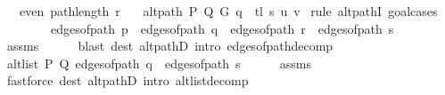 \begin{isabellebody}
\ \ \ {\isachardoublequoteopen}even\ {\isacharparenleft}{\kern0pt}path{\isacharunderscore}{\kern0pt}length\ r{\isacharparenright}{\kern0pt}{\isachardoublequoteclose}\isanewline
\ \ \ {\isachardoublequoteopen}alt{\isacharunderscore}{\kern0pt}path\ P\ Q\ G\ {\isacharparenleft}{\kern0pt}q\ {\isacharat}{\kern0pt}\ tl\ s{\isacharparenright}{\kern0pt}\ u\ v{\isachardoublequoteclose}%
\endisataginvisible
{\isafoldinvisible}%
%
\isadeliminvisible
\isanewline
%
\endisadeliminvisible
%
\isadelimproof
%
\endisadelimproof
%
\isatagproof
{}\isamarkupfalse%
\ {\isacharparenleft}{\kern0pt}rule\ alt{\isacharunderscore}{\kern0pt}pathI{\isacharcomma}{\kern0pt}\ goal{\isacharunderscore}{\kern0pt}cases{\isacharparenright}{\kern0pt}\isanewline
\ \ \isamarkupfalse%
\ {}\isanewline
\ \ \isamarkupfalse%
\ {\isachardoublequoteopen}edges{\isacharunderscore}{\kern0pt}of{\isacharunderscore}{\kern0pt}path\ p\ {\isacharequal}{\kern0pt}\ edges{\isacharunderscore}{\kern0pt}of{\isacharunderscore}{\kern0pt}path\ q\ {\isacharat}{\kern0pt}\ edges{\isacharunderscore}{\kern0pt}of{\isacharunderscore}{\kern0pt}path\ r\ {\isacharat}{\kern0pt}\ edges{\isacharunderscore}{\kern0pt}of{\isacharunderscore}{\kern0pt}path\ s{\isachardoublequoteclose}\isanewline
\ \ \ \ \isamarkupfalse%
\ assms{\isacharparenleft}{\kern0pt}{}{\isacharminus}{\kern0pt}{}{\isacharparenright}{\kern0pt}\isanewline
\ \ \ \ \isamarkupfalse%
\ {\isacharparenleft}{\kern0pt}blast\ dest{\isacharcolon}{\kern0pt}\ alt{\isacharunderscore}{\kern0pt}pathD{\isacharparenleft}{\kern0pt}{}{\isacharparenright}{\kern0pt}\ intro{\isacharcolon}{\kern0pt}\ edges{\isacharunderscore}{\kern0pt}of{\isacharunderscore}{\kern0pt}path{\isacharunderscore}{\kern0pt}decomp{\isacharparenright}{\kern0pt}\isanewline
\ \ \isamarkupfalse%
\ {\isachardoublequoteopen}alt{\isacharunderscore}{\kern0pt}list\ P\ Q\ {\isacharparenleft}{\kern0pt}edges{\isacharunderscore}{\kern0pt}of{\isacharunderscore}{\kern0pt}path\ q\ {\isacharat}{\kern0pt}\ edges{\isacharunderscore}{\kern0pt}of{\isacharunderscore}{\kern0pt}path\ s{\isacharparenright}{\kern0pt}{\isachardoublequoteclose}\isanewline
\ \ \ \ \isamarkupfalse%
\ assms{\isacharparenleft}{\kern0pt}{}{\isacharcomma}{\kern0pt}\ {}{\isacharparenright}{\kern0pt}\isanewline
\ \ \ \ \isamarkupfalse%
\ {\isacharparenleft}{\kern0pt}fastforce\ dest{\isacharcolon}{\kern0pt}\ alt{\isacharunderscore}{\kern0pt}pathD{\isacharparenleft}{\kern0pt}{}{\isacharparenright}{\kern0pt}\ intro{\isacharcolon}{\kern0pt}\ alt{\isacharunderscore}{\kern0pt}list{\isacharunderscore}{\kern0pt}decomp{\isacharparenright}{\kern0pt}\isanewline

\end{isabellebody}
